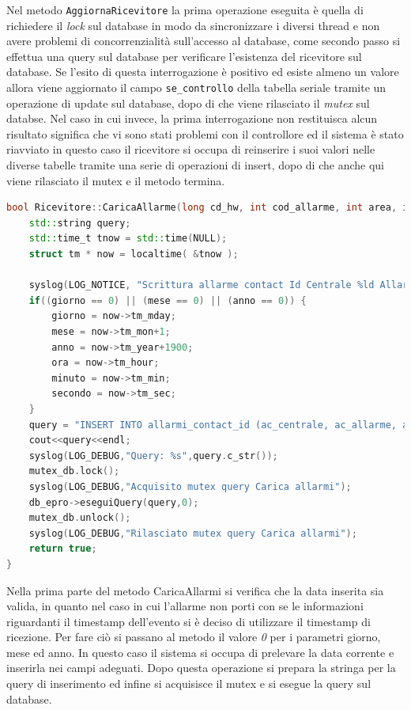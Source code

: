 Nel metodo \texttt{AggiornaRicevitore} la prima operazione eseguita è quella di richiedere il \emph{lock} sul database in modo da sincronizzare i diversi thread e non avere problemi di concorrenzialità sull'accesso al database, come secondo passo si effettua una query sul database per verificare l'esistenza del ricevitore sul database. Se l'esito di questa interrogazione è positivo ed esiste almeno un valore allora viene aggiornato il campo \texttt{se\_controllo} della tabella seriale tramite un operazione di update sul database, dopo di che viene rilasciato il \emph{mutex} sul databse.
Nel caso in cui invece, la prima interrogazione non restituisca alcun risultato significa che vi sono stati problemi con il controllore ed il sistema è stato riavviato in questo caso il ricevitore si occupa di reinserire i suoi valori nelle diverse tabelle tramite una serie di operazioni di insert, dopo di che anche qui viene rilasciato il mutex e il metodo termina.
\begin{lstlisting}[language=C++,caption=Metodo CaricaAllarme,label=lst:CaricaAllarme]
bool Ricevitore::CaricaAllarme(long cd_hw, int cod_allarme, int area, int zona, int giorno, int mese, int anno, int ora, int minuto, int secondo) {
	std::string query;
	std::time_t tnow = std::time(NULL);
	struct tm * now = localtime( &tnow );
	
	syslog(LOG_NOTICE, "Scrittura allarme contact Id Centrale %ld Allarme: %d, Area: %d Zona: %d Data: %d:%d:%d %d/%d/%d",cd_hw, cod_allarme, area, zona, ora, minuto, secondo, giorno,mese,anno);
	if((giorno == 0) || (mese == 0) || (anno == 0)) {
		giorno = now->tm_mday;
		mese = now->tm_mon+1;
		anno = now->tm_year+1900;
		ora = now->tm_hour;
		minuto = now->tm_min;
		secondo = now->tm_sec;
	}
	query = "INSERT INTO allarmi_contact_id (ac_centrale, ac_allarme, ac_area, ac_zona, ac_giorno, ac_mese, ac_anno, ac_ora, ac_minuto, ac_secondo,ac_porta_seriale,ac_n_ricevitore,ac_n_gruppo) VALUES ('"+std::to_string(cd_hw)+"','"+std::to_string(cod_allarme)+"','"+std::to_string(area)+"','"+std::to_string(zona)+"','"+std::to_string(giorno)+"','"+std::to_string(mese)+"','"+std::to_string(anno)+"','"+std::to_string(ora)+"','"+std::to_string(minuto)+"','"+std::to_string(secondo)+"','"+std::to_string(nseriale)+"','"+std::to_string(nricevitore)+"','1');";
	cout<<query<<endl;
	syslog(LOG_DEBUG,"Query: %s",query.c_str());
	mutex_db.lock();
	syslog(LOG_DEBUG,"Acquisito mutex query Carica allarmi");
	db_epro->eseguiQuery(query,0);
	mutex_db.unlock();
	syslog(LOG_DEBUG,"Rilasciato mutex query Carica allarmi");
	return true;
}
\end{lstlisting}
Nella prima parte del metodo CaricaAllarmi si verifica che la data inserita sia valida, in quanto nel caso in cui l'allarme non porti con se le informazioni riguardanti il timestamp dell'evento si è deciso di utilizzare il timestamp di ricezione. Per fare ciò si passano al metodo il valore \emph{0} per i parametri giorno, mese ed anno. In questo caso il sistema si occupa di prelevare la data corrente e inserirla nei campi adeguati. Dopo questa operazione si prepara la stringa per la query di inserimento ed infine si acquisisce il mutex e si esegue la query sul database.
